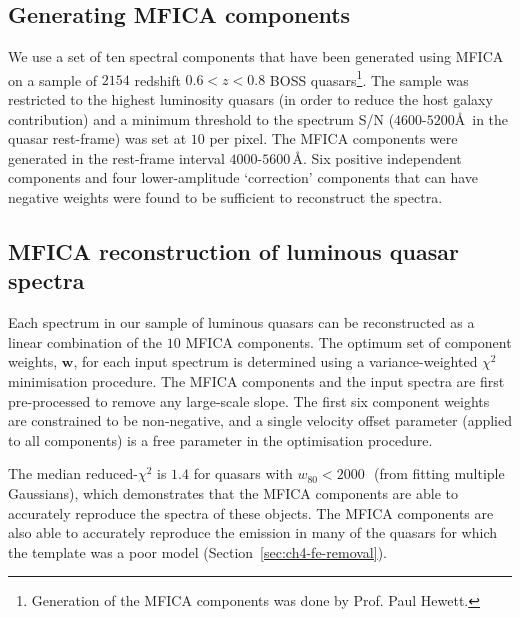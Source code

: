 \subsection{Generating MFICA components}

We use a set of ten spectral components that have been generated using MFICA on a sample of $2154$ redshift $0.6 < z < 0.8$ BOSS quasars\footnote{Generation of the MFICA components was done by Prof. Paul Hewett.}.
The sample was restricted to the highest luminosity quasars (in order to reduce the host galaxy contribution) and a minimum threshold to the spectrum S/N ($4600$-$5200$\AA\, in the quasar rest-frame) was set at $10$ per pixel.
The MFICA components were generated in the rest-frame interval $4000$-$5600$\,\AA.
Six positive independent components and four lower-amplitude `correction' components that can have negative weights were found to be sufficient to reconstruct the spectra. 

\subsection{MFICA reconstruction of luminous quasar spectra}

Each spectrum in our sample of luminous quasars can be reconstructed as a linear combination of the $10$ MFICA components. 
The optimum set of component weights, $\mathbf{w}$, for each input spectrum is determined using a variance-weighted $\chi^2$ minimisation procedure. 
The MFICA components and the input spectra are first pre-processed to remove any large-scale slope.  
The first six component weights are constrained to be non-negative, and a single velocity offset parameter (applied to all components) is a free parameter in the optimisation procedure. 

The median reduced-$\chi^2$ is $1.4$ for quasars with $w_{80} < 2000$\,\kms\, (from fitting multiple Gaussians), which demonstrates that the MFICA components are able to accurately reproduce the spectra of these objects. 
The MFICA components are also able to accurately reproduce the  emission in many of the quasars for which the \citet{boroson92} template was a poor model (Section~\ref{sec:ch4-fe-removal}). 

